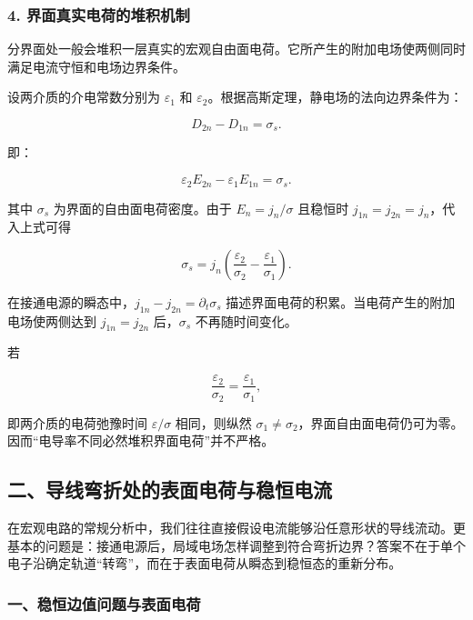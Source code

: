 \subsubsection{4.
界面真实电荷的堆积机制}\label{m4:ux754cux9762ux771fux5b9eux7535ux8377ux7684ux5806ux79efux673aux5236}

分界面处一般会堆积一层真实的宏观自由面电荷。它所产生的附加电场使两侧同时满足电流守恒和电场边界条件。

设两介质的介电常数分别为 \(\varepsilon_1\) 和
\(\varepsilon_2\)。根据高斯定理，静电场的法向边界条件为：

\[
\boxed{D_{2n}-D_{1n}=\sigma_s}.
\]

即：

\[
\varepsilon_2E_{2n}-\varepsilon_1E_{1n}=\sigma_s.
\]

其中 \(\sigma_s\) 为界面的自由面电荷密度。由于 \(E_n=j_n/\sigma\)
且稳恒时 \(j_{1n}=j_{2n}=j_n\)，代入上式可得

\[
\boxed{
\sigma_s=j_n\left(
\frac{\varepsilon_2}{\sigma_2}
-\frac{\varepsilon_1}{\sigma_1}
\right)
}.
\]

在接通电源的瞬态中，\(j_{1n}-j_{2n}=\partial_t\sigma_s\)
描述界面电荷的积累。当电荷产生的附加电场使两侧达到 \(j_{1n}=j_{2n}\)
后，\(\sigma_s\) 不再随时间变化。

若

\[
\frac{\varepsilon_2}{\sigma_2}
=\frac{\varepsilon_1}{\sigma_1},
\]

即两介质的电荷弛豫时间 \(\varepsilon/\sigma\) 相同，则纵然
\(\sigma_1\ne\sigma_2\)，界面自由面电荷仍可为零。因而``电导率不同必然堆积界面电荷''并不严格。

\subsection{二、导线弯折处的表面电荷与稳恒电流}\label{m4:ux4e8cux5bfcux7ebfux5f2fux6298ux5904ux7684ux8868ux9762ux7535ux8377ux4e0eux7a33ux6052ux7535ux6d41}

在宏观电路的常规分析中，我们往往直接假设电流能够沿任意形状的导线流动。更基本的问题是：接通电源后，局域电场怎样调整到符合弯折边界？答案不在于单个电子沿确定轨道``转弯''，而在于表面电荷从瞬态到稳恒态的重新分布。

\subsubsection{一、稳恒边值问题与表面电荷}\label{m4:ux4e00ux7a33ux6052ux8fb9ux503cux95eeux9898ux4e0eux8868ux9762ux7535ux8377}

